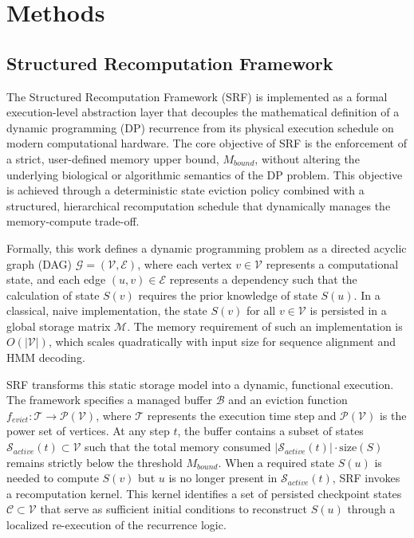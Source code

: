 \section{Methods}

\subsection{Structured Recomputation Framework}

The Structured Recomputation Framework (SRF) is implemented as a formal execution-level abstraction layer that decouples the mathematical definition of a dynamic programming (DP) recurrence from its physical execution schedule on modern computational hardware. The core objective of SRF is the enforcement of a strict, user-defined memory upper bound, $M_{bound}$, without altering the underlying biological or algorithmic semantics of the DP problem. This objective is achieved through a deterministic state eviction policy combined with a structured, hierarchical recomputation schedule that dynamically manages the memory-compute trade-off.

Formally, this work defines a dynamic programming problem as a directed acyclic graph (DAG) $\mathcal{G} = (\mathcal{V}, \mathcal{E})$, where each vertex $v \in \mathcal{V}$ represents a computational state, and each edge $(u, v) \in \mathcal{E}$ represents a dependency such that the calculation of state $S(v)$ requires the prior knowledge of state $S(u)$. In a classical, naive implementation, the state $S(v)$ for all $v \in \mathcal{V}$ is persisted in a global storage matrix $\mathcal{M}$. The memory requirement of such an implementation is $O(|\mathcal{V}|)$, which scales quadratically with input size for sequence alignment and HMM decoding.

SRF transforms this static storage model into a dynamic, functional execution. The framework specifies a managed buffer $\mathcal{B}$ and an eviction function $f_{evict}: \mathcal{T} \to \mathcal{P}(\mathcal{V})$, where $\mathcal{T}$ represents the execution time step and $\mathcal{P}(\mathcal{V})$ is the power set of vertices. At any step $t$, the buffer contains a subset of states $\mathcal{S}_{active}(t) \subset \mathcal{V}$ such that the total memory consumed $|\mathcal{S}_{active}(t)| \cdot \text{size}(S)$ remains strictly below the threshold $M_{bound}$. When a required state $S(u)$ is needed to compute $S(v)$ but $u$ is no longer present in $\mathcal{S}_{active}(t)$, SRF invokes a recomputation kernel. This kernel identifies a set of persisted checkpoint states $\mathcal{C} \subset \mathcal{V}$ that serve as sufficient initial conditions to reconstruct $S(u)$ through a localized re-execution of the recurrence logic.

